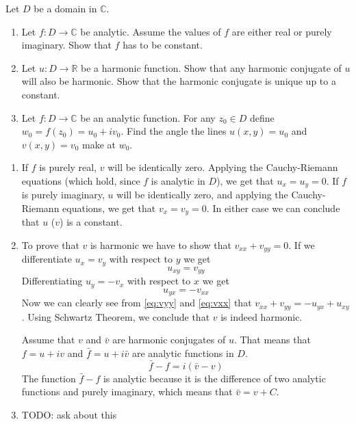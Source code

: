 \documentclass{article}
\def\C{\mathbb{C}}
\def\R{\mathbb{R}}
\begin{document}
    \begin{tcolorbox}[title=Exercise 3]
        Let $D$ be a domain in $\C$.
        \begin{enumerate}[label=(\alph*)]
            \item Let $f \colon D \to \C$ be analytic. Assume the values of $f$ are either real or purely imaginary. Show that $f$ has to be constant.
            \item Let $u \colon D \to \R$ be a harmonic function. Show that any harmonic conjugate of $u$ will also be harmonic. Show that the harmonic conjugate is unique up to a constant.
            \item Let $f \colon D \to \C$ be an analytic function. For any $z_0 \in D$ define $w_0 = f(z_0) = u_0 + iv_0$. Find the angle the lines $u(x, y) = u_0$ and $v(x, y) = v_0$ make at $w_0$.
        \end{enumerate}
    \end{tcolorbox}
    \begin{enumerate}[label=(\alph*)]
        \item If $f$ is purely real, $v$ will be identically zero. Applying the Cauchy-Riemann equations (which hold, since $f$ is analytic in $D$), we get that $u_x = u_y = 0$.  If $f$ is purely imaginary, $u$ will be identically zero, and applying the Cauchy-Riemann equations, we get that $v_x = v_y = 0$. In either case we can conclude that $u$ ($v$) is a constant.
        \item To prove that $v$ is harmonic we have to show that $v_{xx} + v_{yy} = 0$. If we differentiate $u_x = v_y$ with respect to $y$ we get
        \begin{equation}
            \label{eq:vyy}
            u_{xy} = v_{yy}
        \end{equation}
        Differentiating $u_y = -v_x$ with respect to $x$ we get
        \begin{equation}
            \label{eq:vxx}
            u_{yx} = -v_{xx}
        \end{equation}
        Now we can clearly see from \eqref{eq:vyy} and \eqref{eq:vxx} that $v_{xx} + v_{yy} = -u_{yx} + u_{xy}$. Using Schwartz Theorem, we conclude that $v$ is indeed harmonic. \par
        Assume that $v$ and $\bar{v}$ are harmonic conjugates of $u$. That means that $f = u + iv$ and $\bar{f} = u + i\bar{v}$ are analytic functions in $D$.
        \begin{equation*}
            \bar{f} - f = i(\bar{v} - v)
        \end{equation*}
        The function $\bar{f} - f$ is analytic because it is the difference of two analytic functions and purely imaginary, which means that $\bar{v} = v + C$.
        \item TODO: ask about this
    \end{enumerate}
\end{document}
